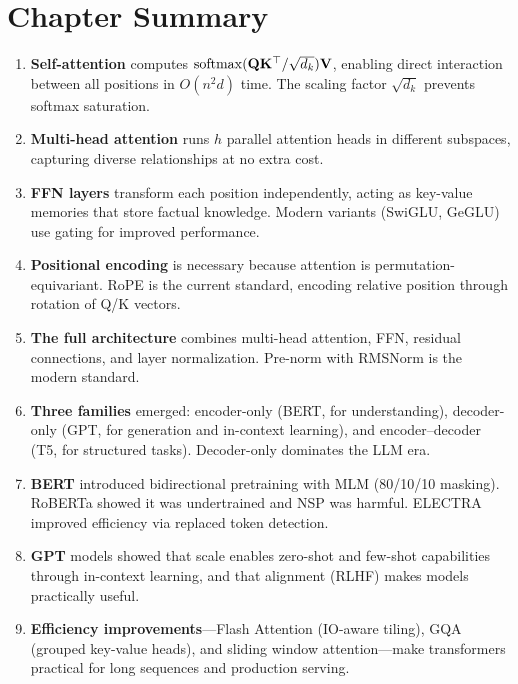 \section*{Chapter Summary}

\begin{enumerate}
    \item \textbf{Self-attention} computes $\operatorname{softmax}(\mathbf{Q}\mathbf{K}^\top/\sqrt{d_k})\mathbf{V}$,
          enabling direct interaction between all positions in $O(n^2 d)$ time.
          The scaling factor $\sqrt{d_k}$ prevents softmax saturation.

    \item \textbf{Multi-head attention} runs $h$ parallel attention heads in
          different subspaces, capturing diverse relationships at no extra cost.

    \item \textbf{FFN layers} transform each position independently, acting as
          key-value memories that store factual knowledge.  Modern variants
          (SwiGLU, GeGLU) use gating for improved performance.

    \item \textbf{Positional encoding} is necessary because attention is
          permutation-equivariant.  RoPE is the current standard, encoding
          relative position through rotation of Q/K vectors.

    \item \textbf{The full architecture} combines multi-head attention, FFN,
          residual connections, and layer normalization.  Pre-norm with RMSNorm
          is the modern standard.

    \item \textbf{Three families} emerged: encoder-only (BERT, for understanding),
          decoder-only (GPT, for generation and in-context learning), and
          encoder--decoder (T5, for structured tasks).  Decoder-only dominates
          the LLM era.

    \item \textbf{BERT} introduced bidirectional pretraining with MLM (80/10/10
          masking).  RoBERTa showed it was undertrained and NSP was harmful.
          ELECTRA improved efficiency via replaced token detection.

    \item \textbf{GPT} models showed that scale enables zero-shot and few-shot
          capabilities through in-context learning, and that alignment (RLHF)
          makes models practically useful.

    \item \textbf{Efficiency improvements}---Flash Attention (IO-aware tiling),
          GQA (grouped key-value heads), and sliding window attention---make
          transformers practical for long sequences and production serving.
\end{enumerate}

